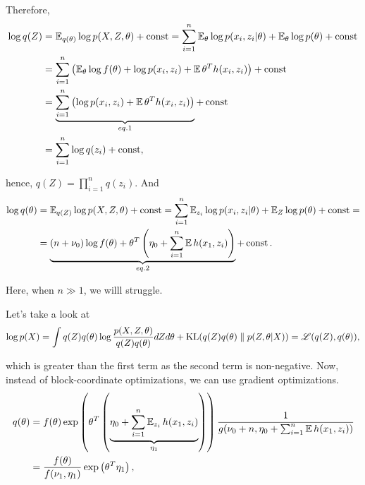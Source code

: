 Therefore,
\begin{equation*}
    \begin{aligned}
        \log  q(Z) &= \operatorname{\mathbb{E}}_{q(\theta)} \log p(X, Z, \theta) + \operatorname{const} = \sum_{i = 1}^n \operatorname{\mathbb{E}}_{\theta} \log p(x_i, z_i | \theta) + \operatorname{\mathbb{E}}_\theta\log p(\theta) + \operatorname{const} \\
        &= \sum_{i = 1}^n \left( \operatorname{\mathbb{E}}_\theta \log f(\theta) + \log p(x_i, z_i) + \operatorname{\mathbb{E}} \theta^T h(x_i, z_i)\right) + \operatorname{const} \\
        &= \underbrace{\sum_{i = 1}^n \left(\log p(x_i, z_i) + \operatorname{\mathbb{E}} \theta^T h(x_i, z_i) \right)}_{eq. 1} + \operatorname{const} \\
        &= \sum_{i = 1}^n \log q(z_i) + \operatorname{const},
    \end{aligned}
\end{equation*}

hence, $q(Z) = \prod_{i = 1}^n q(z_i)$. And
\begin{equation*}
    \begin{aligned}
           \log q(\theta) &= \operatorname{\mathbb{E}}_{q(Z)} \log p(X, Z, \theta) + \operatorname{const} = \sum_{i = 1}^n \operatorname{\mathbb{E}}_{z_i} \log p(x_i, z_i | \theta) + \operatorname{\mathbb{E}}_{Z} \log p(\theta) + \operatorname{const} = \\
        &= \underbrace{(n + \nu_0) \log f(\theta) + \theta^T \left( \eta_0 + \sum_{i = 1}^n \operatorname{\mathbb{E}} h(x_1, z_i) \right)}_{eq. 2} + \operatorname{const}.
    \end{aligned}
\end{equation*}

\begin{eremark}
       Here, when $n \gg 1$, we willl struggle.
\end{eremark}

Let's take a look at
\begin{equation*}
    \log p(X) = \int q(Z) q(\theta) \log \frac{p(X, Z, \theta)}{q(Z) q(\theta)} dZ d\theta + \operatorname{KL}(q(Z) q(\theta) \parallel p(Z, \theta | X)) = \operatorname{\mathscr{L}}(q(Z), q(\theta)),
\end{equation*}

which is greater than the first term as the second term is non-negative. Now, instead of block-coordinate optimizations, we can use gradient optimizations.
\begin{equation*}
    \begin{aligned}
        q(\theta) &= f(\theta) \exp \left( \theta^T \left( \underbrace{\eta_0 + \sum_{i = 1}^n \operatorname{\mathbb{E}}_{z_i} h(x_1, z_i)}_{\eta_1}\right) \right) \frac{1}{g(\nu_0 + n, \eta_0 + \sum_{i = 1}^n \operatorname{\mathbb{E}} h(x_1, z_i))} \\
        &= \frac{f(\theta)}{f(\nu_1, \eta_1)} \exp \left( \theta^T \eta_1 \right),
    \end{aligned}
\end{equation*}

